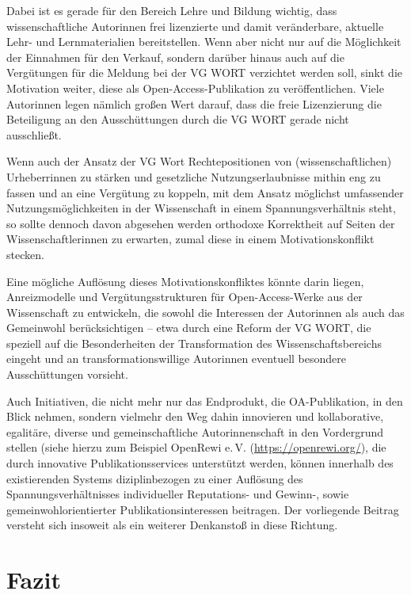 \documentclass[a4paper,
fontsize=11pt,
oneside,
numbers=noperiodatend,
parskip=half-,
bibliography=totoc,
final
]{scrartcl}
\begin{document}
Dabei ist es gerade für den Bereich Lehre und Bildung wichtig, dass
wissenschaftliche Autorinnen frei lizenzierte und damit veränderbare,
aktuelle Lehr- und Lernmaterialien bereitstellen. Wenn aber nicht nur
auf die Möglichkeit der Einnahmen für den Verkauf, sondern darüber
hinaus auch auf die Vergütungen für die Meldung bei der VG WORT
verzichtet werden soll, sinkt die Motivation weiter, diese als
Open-Access-Publikation zu veröffentlichen. Viele Autorinnen legen
nämlich großen Wert darauf, dass die freie Lizenzierung die Beteiligung
an den Ausschüttungen durch die VG WORT gerade nicht ausschließt.

Wenn auch der Ansatz der VG Wort Rechtepositionen von
(wissenschaftlichen) Urheberrinnen zu stärken und gesetzliche
Nutzungserlaubnisse mithin eng zu fassen und an eine Vergütung zu
koppeln, mit dem Ansatz möglichst umfassender Nutzungsmöglichkeiten in
der Wissenschaft in einem Spannungsverhältnis steht, so sollte dennoch
davon abgesehen werden orthodoxe Korrektheit auf Seiten der
Wissenschaftlerinnen zu erwarten, zumal diese in einem
Motivationskonflikt stecken.

Eine mögliche Auflösung dieses Motivationskonfliktes könnte darin
liegen, Anreizmodelle und Vergütungsstrukturen für Open-Access-Werke aus
der Wissenschaft zu entwickeln, die sowohl die Interessen der Autorinnen
als auch das Gemeinwohl berücksichtigen -- etwa durch eine Reform der VG
WORT, die speziell auf die Besonderheiten der Transformation des
Wissenschaftsbereichs eingeht und an transformationswillige Autorinnen
eventuell besondere Ausschüttungen vorsieht.

Auch Initiativen, die nicht mehr nur das Endprodukt, die OA-Publikation,
in den Blick nehmen, sondern vielmehr den Weg dahin innovieren und
kollaborative, egalitäre, diverse und gemeinschaftliche Autorinnenschaft
in den Vordergrund stellen (siehe hierzu zum Beispiel OpenRewi e.\,V.
(\url{https://openrewi.org/}), die durch innovative Publikationsservices
unterstützt werden, können innerhalb des existierenden Systems
diziplinbezogen zu einer Auflösung des Spannungsverhältnisses
individueller Reputations- und Gewinn-, sowie gemeinwohlorientierter
Publikationsinteressen beitragen. Der vorliegende Beitrag versteht sich
insoweit als ein weiterer Denkanstoß in diese Richtung.

\hypertarget{fazit}{%
\section{Fazit}\label{fazit}}
\end{document}
